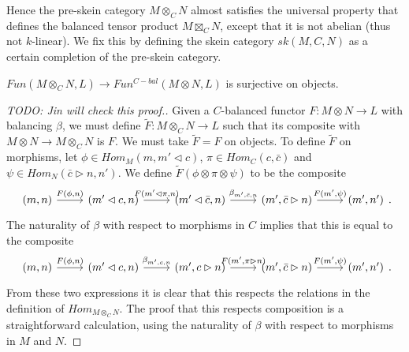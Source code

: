 \begin{remark}
  Hence the pre-skein category $M \otimes_{C} N$ almost satisfies the universal property that defines the balanced tensor product $M \boxtimes_{C} N$, except that it is not abelian (thus not $k$-linear). We fix this by defining the skein category $sk(M,C,N)$ as a certain completion of the pre-skein category.
\end{remark}

\begin{lemma}\label{surjective}
  $Fun(M\otimes_C N,L)\to Fun^{C-bal}(M\otimes N,L)$ is surjective on
  objects.
\end{lemma}

\begin{proof}
  [TODO: Jin will check this proof.]
  Given a $C$-balanced functor $F:M\otimes N \to L$ with balancing $\beta$, we
  must define $\tilde{F}:M\otimes_C N \to L$ such that its composite with
  $M\otimes N\to M\otimes_C N$ is $F$. We must take $\tilde{F}=F$ on objects.
  To define $\tilde{F}$ on morphisms, let $\phi\in Hom_M(m,m'\lhd c)$,
  $\pi\in Hom_C(c,\bar{c})$ and $\psi\in Hom_N(\bar{c}\rhd n,n')$. We define
  $\tilde{F}(\phi\otimes\pi\otimes\psi)$ to be the composite
  \[
    \begin{tikzcd}
      {(m,n)} & {(m'\lhd c,n)} & {(m'\lhd \bar{c},n)} & {(m',\bar{c}\rhd n)} & {(m',n')}
      \arrow["{F(\phi,n)}", from=1-1, to=1-2]
      \arrow["{F(m'\lhd\pi,n)}", from=1-2, to=1-3]
      \arrow["{\beta_{m',\bar{c},n}}", from=1-3, to=1-4]
      \arrow["{F(m',\psi)}", from=1-4, to=1-5]
    \end{tikzcd}.
  \]
  The naturality of $\beta$ with respect to morphisms in $C$ implies that this
  is equal to the composite
  \[
    \begin{tikzcd}
      {(m,n)} & {(m'\lhd c,n)} & {(m', c\rhd n)} & {(m',\bar{c}\rhd n)} & {(m',n')}
      \arrow["{F(\phi,n)}", from=1-1, to=1-2]
      \arrow["{\beta_{m',c,n}}", from=1-2, to=1-3]
      \arrow["{F(m',\pi\rhd n)}", from=1-3, to=1-4]
      \arrow["{F(m',\psi)}", from=1-4, to=1-5]
    \end{tikzcd}.
  \]
  From these two expressions it is clear that this respects the relations in
  the definition of $Hom_{M\otimes_C N}$. The proof that this respects
  composition is a straightforward calculation, using the naturality of
  $\beta$ with respect to morphisms in $M$ and $N$.
  \end{proof}

